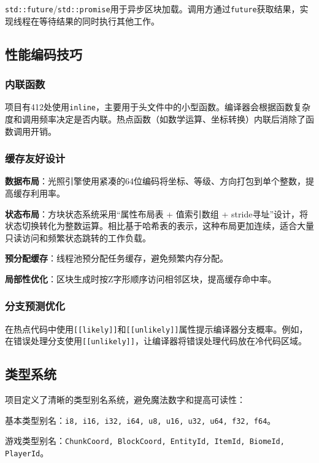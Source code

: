 \texttt{std::future}/\texttt{std::promise}用于异步区块加载。调用方通过\texttt{future}获取结果，实现线程在等待结果的同时执行其他工作。

\subsection{性能编码技巧}

\subsubsection{内联函数}

项目有412处使用\texttt{inline}，主要用于头文件中的小型函数。编译器会根据函数复杂度和调用频率决定是否内联。热点函数（如数学运算、坐标转换）内联后消除了函数调用开销。

\subsubsection{缓存友好设计}

\textbf{数据布局}：光照引擎使用紧凑的64位编码将坐标、等级、方向打包到单个整数，提高缓存利用率。

\textbf{状态布局}：方块状态系统采用“属性布局表 + 值索引数组 + stride寻址”设计，将状态切换转化为整数运算。相比基于哈希表的表示，这种布局更加连续，适合大量只读访问和频繁状态跳转的工作负载。

\textbf{预分配缓存}：线程池预分配任务缓存，避免频繁内存分配。

\textbf{局部性优化}：区块生成时按Z字形顺序访问相邻区块，提高缓存命中率。

\subsubsection{分支预测优化}

在热点代码中使用\texttt{[[likely]]}和\texttt{[[unlikely]]}属性提示编译器分支概率。例如，在错误处理分支使用\texttt{[[unlikely]]}，让编译器将错误处理代码放在冷代码区域。

\subsection{类型系统}

项目定义了清晰的类型别名系统，避免魔法数字和提高可读性：

基本类型别名：\texttt{i8, i16, i32, i64, u8, u16, u32, u64, f32, f64}。

游戏类型别名：\texttt{ChunkCoord, BlockCoord, EntityId, ItemId, BiomeId, PlayerId}。

